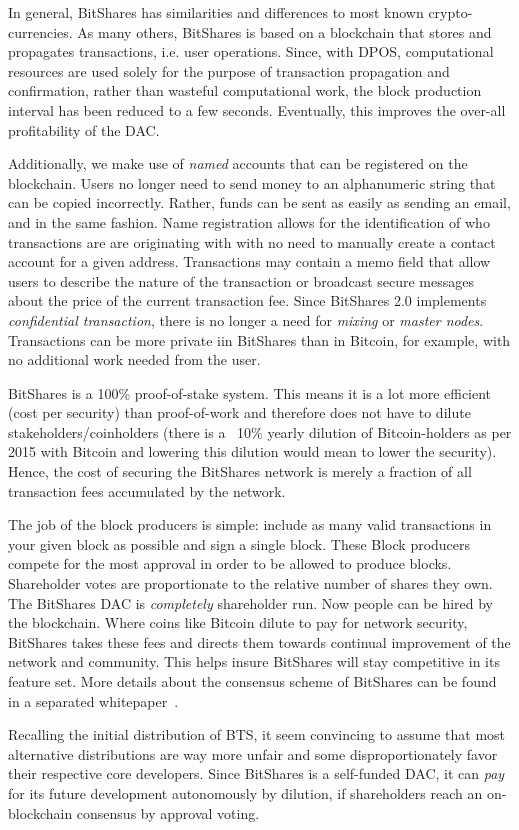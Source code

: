 In general, BitShares has similarities and differences to most known
crypto-currencies. As many others, BitShares is based on a blockchain that
stores and propagates transactions, i.e. user operations. Since, with DPOS,
computational resources are used solely for the purpose of transaction
propagation and confirmation, rather than wasteful computational work, the
block production interval has been reduced to a few seconds. Eventually, this
improves the over-all profitability of the DAC.

Additionally, we make use of \emph{named} accounts that can be registered on
the blockchain. Users no longer need to send money to an alphanumeric string
that can be copied incorrectly. Rather, funds can be sent as easily as sending
an email, and in the same fashion. Name registration allows for the
identification of who transactions are are originating with with no need to
manually create a contact account for a given address. Transactions may contain
a memo field that allow users to describe the nature of the transaction or
broadcast secure messages about the price of the current transaction fee. Since
BitShares 2.0 implements \emph{confidential transaction}, there is no longer a
need for \emph{mixing} or \emph{master nodes}. Transactions can be more private
iin BitShares than in Bitcoin, for example, with no additional work needed from
the user.

BitShares is a 100\% proof-of-stake system. This means it is a lot more
efficient (cost per security) than proof-of-work and therefore does not have to
dilute stakeholders/coinholders (there is a ~10\% yearly dilution of
Bitcoin-holders as per 2015 with Bitcoin and lowering this dilution would mean
to lower the security). Hence, the cost of securing the BitShares network is
merely a fraction of all transaction fees accumulated by the network. 

The job of the block producers is simple: include as many valid transactions in
your given block as possible and sign a single block. These Block producers
compete for the most approval in order to be allowed to produce blocks.
Shareholder votes are proportionate to the relative number of shares they own.
The BitShares DAC is \emph{completely} shareholder run. Now people can be hired
by the blockchain. Where coins like Bitcoin dilute to pay for network security,
BitShares takes these fees and directs them towards continual improvement of
the network and community. This helps insure BitShares will stay competitive in
its feature set. More details about the consensus scheme of BitShares can be
found in a separated whitepaper~\cite{}.

Recalling the initial distribution of BTS, it seem convincing to assume that
most alternative distributions are way more unfair and some disproportionately
favor their respective core developers. Since BitShares is a self-funded DAC,
it can \emph{pay} for its future development autonomously by dilution, if
shareholders reach an on-blockchain consensus by approval voting.
